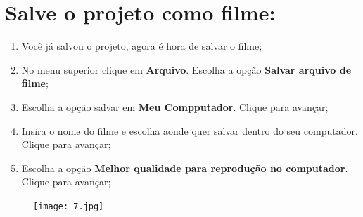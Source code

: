 \documentclass{article}
\begin{document}
{\newpage

\section{Salve o projeto como filme:}
\begin{enumerate}
\item Você já salvou o projeto, agora é hora de salvar o filme;
\item No menu superior clique em \textbf{Arquivo}. Escolha a opção \textbf{Salvar arquivo de filme};
\item Escolha a opção salvar em \textbf{Meu Compputador}. Clique para
avançar;
\item Insira o nome do filme e escolha aonde quer salvar dentro do seu computador. Clique para avançar;
\item Escolha a opção \textbf{Melhor qualidade para reprodução no computador}. Clique para avançar;
\end{enumerate}

\begin{figure}[h!]
\centering
\texttt{[image: 7.jpg]}
\end{figure}



}
\end{document}
